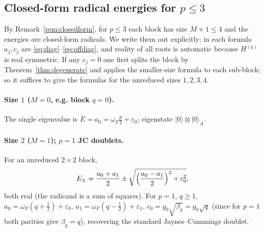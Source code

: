 \documentclass[12pt]{article}
\theoremstyle{definition}
\theoremstyle{remark}
\newcommand{\ket}[1]{\lvert #1\rangle}
\begin{document}
\subsection{Closed-form radical energies for $p\le3$}\label{sec:radical}

By Remark~\ref{rem:closedform}, for $p\le3$ each block has size $M+1\le4$ and the
energies are closed-form radicals. We write them out explicitly; in each formula
$a_j,c_j$ are \eqref{eq:diag}--\eqref{eq:offdiag}, and reality of all roots is
automatic because $H^{(q)}$ is real symmetric. If any $c_j=0$ one first splits the
block by Theorem~\ref{thm:degenerate} and applies the smaller-size formula to each
sub-block; so it suffices to give the formulas for the unreduced sizes $1,2,3,4$.

\paragraph{Size $1$ ($M=0$, e.g. block $q=0$).} The single eigenvalue is
$E=a_0=\omega_F\frac p2+\varepsilon_0$; eigenstate $\ket{0}\otimes\ket0_A$.

\paragraph{Size $2$ ($M=1$); $p=1$ JC doublets.} For an unreduced $2\times2$ block,
\begin{equation}\label{eq:p1}
E_{\pm}=\frac{a_0+a_1}{2}\pm\sqrt{\Bigl(\frac{a_0-a_1}{2}\Bigr)^2+c_0^2},
\end{equation}
both real (the radicand is a sum of squares). For $p=1$, $q\ge1$,
$a_0=\omega_F(q+\tfrac12)+\varepsilon_0$, $a_1=\omega_F(q-\tfrac12)+\varepsilon_1$,
$c_0=g_0\sqrt{\beta_q}=g_0\sqrt q$ (since for $p=1$ both parities give
$\beta_q=q$), recovering the standard Jaynes--Cummings doublet.
\end{document}

